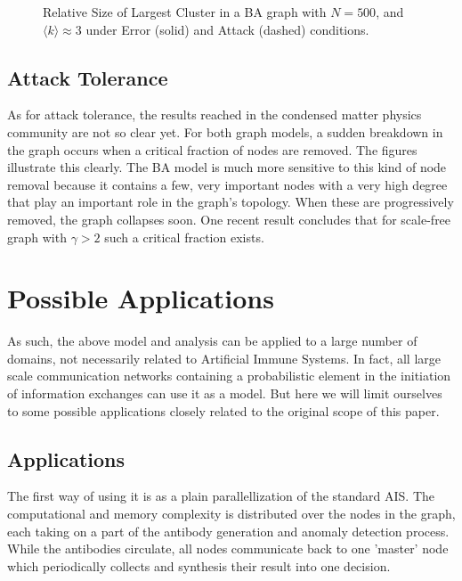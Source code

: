 \documentclass{article}
\begin{document}
\begin{figure}[htp]
   \centerline{
              } 
   \caption{Relative Size of Largest Cluster in a BA graph with $N=500$, and $\langle k \rangle \approx 3$ under Error (solid) and Attack (dashed) conditions.}
   \label{fig_attack_ba}
\end{figure}

\subsection{Attack Tolerance}
As for attack tolerance, the results reached in the condensed matter physics community are not so clear yet.
For both graph models, a sudden breakdown in the graph occurs when a critical fraction of nodes are removed.
The figures illustrate this clearly.
The BA model is much more sensitive to this kind of node removal because it contains a few, very important nodes with a very high degree that play an important role in the graph's topology.
When these are progressively removed, the graph collapses soon. 
One recent result \cite{cohen} concludes that for scale-free graph with $\gamma > 2$ such a critical fraction exists.

\section{Possible Applications}
\label{sec_apps}
As such, the above model and analysis can be applied to a large number of domains, not necessarily related to Artificial Immune Systems.
In fact, all large scale communication networks containing a probabilistic element in the initiation of information exchanges can use it as a model.
But here we will limit ourselves to some possible applications closely related to the original scope of this paper.

\subsection{Applications}
The first way of using it is as a plain parallellization of the standard AIS.
The computational and memory complexity is distributed over the nodes in the graph, each taking on a part of the antibody generation and anomaly detection process.
While the antibodies circulate, all nodes communicate back to one 'master' node which periodically collects and synthesis their result into one decision.
\end{document}

